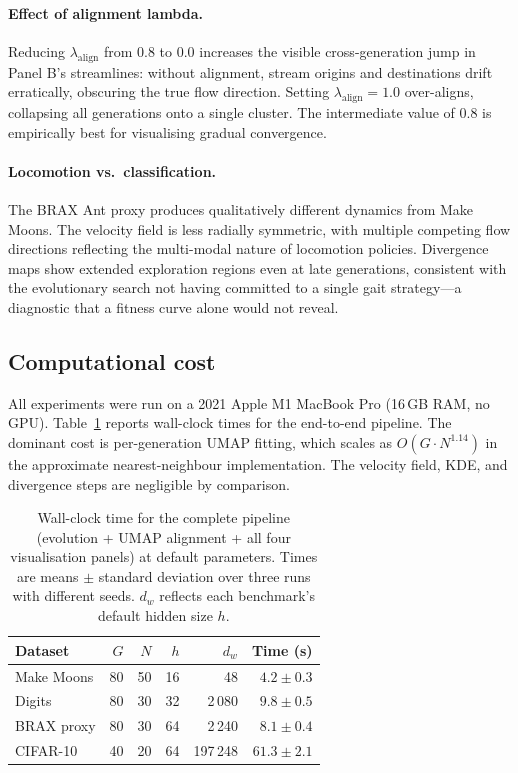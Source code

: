 \documentclass{article}
\begin{document}
\paragraph{Effect of alignment lambda.}
Reducing $\lambda_{\text{align}}$ from 0.8 to 0.0 increases the visible
cross-generation jump in Panel B's streamlines: without alignment, stream
origins and destinations drift erratically, obscuring the true flow direction.
Setting $\lambda_{\text{align}} = 1.0$ over-aligns, collapsing all generations
onto a single cluster.
The intermediate value of $0.8$ is empirically best for visualising gradual
convergence.

\paragraph{Locomotion vs.\ classification.}
The BRAX Ant proxy produces qualitatively different dynamics from Make Moons.
The velocity field is less radially symmetric, with multiple competing flow
directions reflecting the multi-modal nature of locomotion policies.
Divergence maps show extended exploration regions even at late generations,
consistent with the evolutionary search not having committed to a single gait
strategy---a diagnostic that a fitness curve alone would not reveal.

\subsection{Computational cost}

All experiments were run on a 2021 Apple M1 MacBook Pro (16\,GB RAM, no GPU).
Table~\ref{tab:compute} reports wall-clock times for the end-to-end pipeline.
The dominant cost is per-generation UMAP fitting, which scales as
$O(G \cdot N^{1.14})$ in the approximate nearest-neighbour implementation.
The velocity field, KDE, and divergence steps are negligible by comparison.

\begin{table}[h]
  \caption{Wall-clock time for the complete pipeline (evolution + UMAP alignment
  + all four visualisation panels) at default parameters.
  Times are means $\pm$ standard deviation over three runs with different seeds.
  $d_w$ reflects each benchmark's default hidden size $h$.}
  \label{tab:compute}
  \centering
  \begin{tabular}{lrrrrr}
    \toprule
    Dataset      & $G$ & $N$  & $h$ & $d_w$     & Time (s) \\
    \midrule
    Make Moons   & 80  & 50   & 16  & 48        & $4.2 \pm 0.3$ \\
    Digits       & 80  & 30   & 32  & 2\,080    & $9.8 \pm 0.5$ \\
    BRAX proxy   & 80  & 30   & 64  & 2\,240    & $8.1 \pm 0.4$ \\
    CIFAR-10     & 40  & 20   & 64  & 197\,248  & $61.3 \pm 2.1$ \\
    \bottomrule
  \end{tabular}
\end{table}
\end{document}
